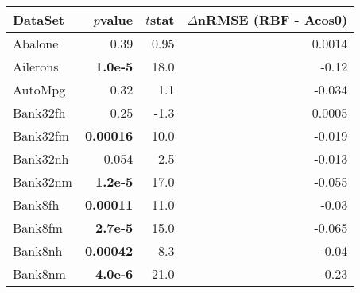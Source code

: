 %
\begin{tabular}{lrrr}
	\toprule
	\textbf{DataSet}                          & \textbf{$p$\textendash{}value} & \textbf{$t$\textendash{}stat} & \textbf{$\Delta$nRMSE (RBF - Acos0)} \\\midrule
	Abalone                                   & 0.39                           & 0.95                          & 0.0014                               \\
	Ailerons                                  & \textbf{1.0e-5}                & 18.0                          & -0.12                                \\
	AutoMpg                                   & 0.32                           & 1.1                           & -0.034                               \\
	Bank32fh                                  & 0.25                           & -1.3                          & 0.0005                               \\
	Bank32fm                                  & \textbf{0.00016}               & 10.0                          & -0.019                               \\
	\addlinespace
	Bank32nh                                  & 0.054                          & 2.5                           & -0.013                               \\
	Bank32nm                                  & \textbf{1.2e-5}                & 17.0                          & -0.055                               \\
	Bank8fh                                   & \textbf{0.00011}               & 11.0                          & -0.03                                \\
	Bank8fm                                   & \textbf{2.7e-5}                & 15.0                          & -0.065                               \\
	Bank8nh                                   & \textbf{0.00042}               & 8.3                           & -0.04                                \\
	\addlinespace
	Bank8nm                                   & \textbf{4.0e-6}                & 21.0                          & -0.23                                \\

\end{tabular}

